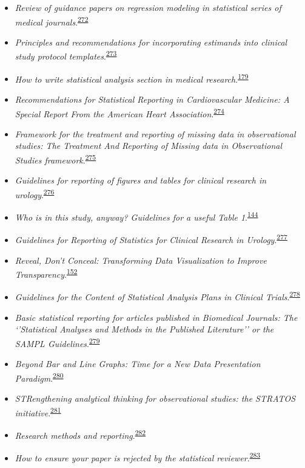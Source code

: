 \documentclass[
  a4paper,
]{book}
\begin{document}
\begin{itemize}
\item
  \emph{Review of guidance papers on regression modeling in statistical series of medical journals}.\textsuperscript{\protect\hyperlink{ref-Wallisch2022}{272}}
\item
  \emph{Principles and recommendations for incorporating estimands into clinical study protocol templates}.\textsuperscript{\protect\hyperlink{ref-Lynggaard2022}{273}}
\item
  \emph{How to write statistical analysis section in medical research}.\textsuperscript{\protect\hyperlink{ref-Dwivedi2022}{179}}
\item
  \emph{Recommendations for Statistical Reporting in Cardiovascular Medicine: A Special Report From the American Heart Association}.\textsuperscript{\protect\hyperlink{ref-Althouse2021}{274}}
\item
  \emph{Framework for the treatment and reporting of missing data in observational studies: The Treatment And Reporting of Missing data in Observational Studies framework}.\textsuperscript{\protect\hyperlink{ref-Lee2021}{275}}
\item
  \emph{Guidelines for reporting of figures and tables for clinical research in urology}.\textsuperscript{\protect\hyperlink{ref-Vickers2020}{276}}
\item
  \emph{Who is in this study, anyway? Guidelines for a useful Table 1}.\textsuperscript{\protect\hyperlink{ref-Hayes-Larson2019}{144}}
\item
  \emph{Guidelines for Reporting of Statistics for Clinical Research in Urology}.\textsuperscript{\protect\hyperlink{ref-assel2019}{277}}
\item
  \emph{Reveal, Don't Conceal: Transforming Data Visualization to Improve Transparency}.\textsuperscript{\protect\hyperlink{ref-Weissgerber2019}{152}}
\item
  \emph{Guidelines for the Content of Statistical Analysis Plans in Clinical Trials}.\textsuperscript{\protect\hyperlink{ref-Gamble2017}{278}}
\item
  \emph{Basic statistical reporting for articles published in Biomedical Journals: The `'Statistical Analyses and Methods in the Published Literature'' or the SAMPL Guidelines}.\textsuperscript{\protect\hyperlink{ref-Lang2015}{279}}
\item
  \emph{Beyond Bar and Line Graphs: Time for a New Data Presentation Paradigm}.\textsuperscript{\protect\hyperlink{ref-Weissgerber2015}{280}}
\item
  \emph{STRengthening analytical thinking for observational studies: the STRATOS initiative}.\textsuperscript{\protect\hyperlink{ref-Sauerbrei2014}{281}}
\item
  \emph{Research methods and reporting}.\textsuperscript{\protect\hyperlink{ref-groves2008}{282}}
\item
  \emph{How to ensure your paper is rejected by the statistical reviewer}.\textsuperscript{\protect\hyperlink{ref-stratton2005}{283}}
\end{itemize}
\end{document}
